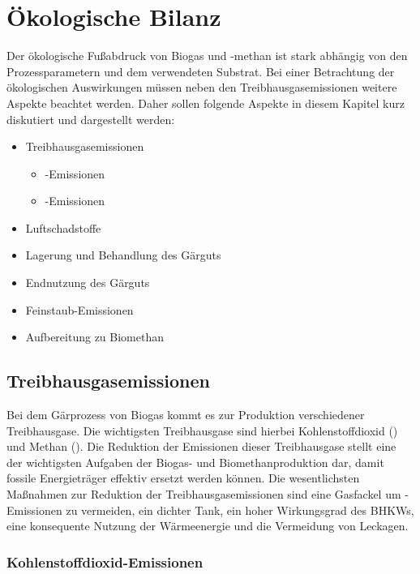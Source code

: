 \section{Ökologische Bilanz}

Der ökologische Fußabdruck von Biogas und -methan ist stark abhängig von den Prozessparametern und dem verwendeten Substrat. Bei einer Betrachtung der ökologischen Auswirkungen müssen neben den Treibhausgasemissionen weitere Aspekte beachtet werden. Daher sollen folgende Aspekte in diesem Kapitel kurz diskutiert und dargestellt werden:

\begin{itemize}
	\item Treibhausgasemissionen
	\begin{itemize}
		\item {}-Emissionen
		\item {}-Emissionen
	\end{itemize}
	\item Luftschadstoffe
	\item Lagerung und Behandlung des Gärguts
	\item Endnutzung des Gärguts
	\item Feinstaub-Emissionen
	\item Aufbereitung zu Biomethan
\end{itemize}


\subsection{Treibhausgasemissionen}

Bei dem Gärprozess von Biogas kommt es zur Produktion verschiedener Treibhausgase. Die wichtigsten Treibhausgase sind hierbei Kohlenstoffdioxid () und Methan (). Die Reduktion der Emissionen dieser Treibhausgase stellt eine der wichtigsten Aufgaben der Biogas- und Biomethanproduktion dar, damit fossile Energieträger effektiv ersetzt werden können. Die wesentlichsten Maßnahmen zur Reduktion der Treibhausgasemissionen sind eine Gasfackel um -Emissionen zu vermeiden, ein dichter Tank, ein hoher Wirkungsgrad des \glspl{BHKW}, eine konsequente Nutzung der Wärmeenergie und die Vermeidung von Leckagen. \parencite{Paolini2018}


\subsubsection{Kohlenstoffdioxid-Emissionen}

